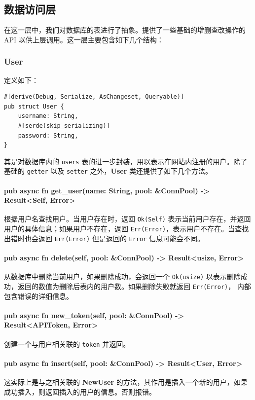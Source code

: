 \documentclass[ichigo,normal,cn]{elegantnote}
\newcommand{\code}[1]{\colorbox{light-gray}{\texttt{#1}}}
\begin{document}
\subsection{数据访问层}
在这一层中，我们对数据库的表进行了抽象。提供了一些基础的增删查改操作的 API 以供上层调用。这一层主要包含如下几个结构：

\subsubsection{User}

定义如下：

\begin{lstlisting}
#[derive(Debug, Serialize, AsChangeset, Queryable)]
pub struct User {
    username: String,
    #[serde(skip_serializing)]
    password: String,
}
\end{lstlisting}

其是对数据库内的 \code{users} 表的进一步封装，用以表示在网站内注册的用户。除了基础的 \code{getter} 以及 \code{setter} 之外，\textbf{User} 类还提供了如下几个方法。

\paragraph{pub async fn get\_user(name: String, pool: \&ConnPool) -> Result<Self, Error>}
根据用户名查找用户。当用户存在时，返回 \code{Ok(Self)} 表示当前用户存在，并返回用户的具体信息；如果用户不存在，返回 \code{Err(Error)}，表示用户不存在。当查找出错时也会返回 \code{Err(Error)} 但是返回的 \code{Error} 信息可能会不同。

\paragraph{pub async fn delete(self, pool: \&ConnPool) -> Result<usize, Error>}
从数据库中删除当前用户，如果删除成功，会返回一个 \code{Ok(usize)} 以表示删除成功，返回的数值为删除后表内的用户数。如果删除失败就返回 \code{Err(Error)}， 内部包含错误的详细信息。

\paragraph{pub async fn new\_token(self, pool: \&ConnPool) -> Result<APIToken, Error>}
创建一个与用户相关联的 \code{token} 并返回。

\paragraph{pub async fn insert(self, pool: \&ConnPool) -> Result<User, Error>}
这实际上是与之相关联的 \textbf{NewUser} 的方法，其作用是插入一个新的用户，如果成功插入，则返回插入的用户的信息。否则报错。
\end{document}
